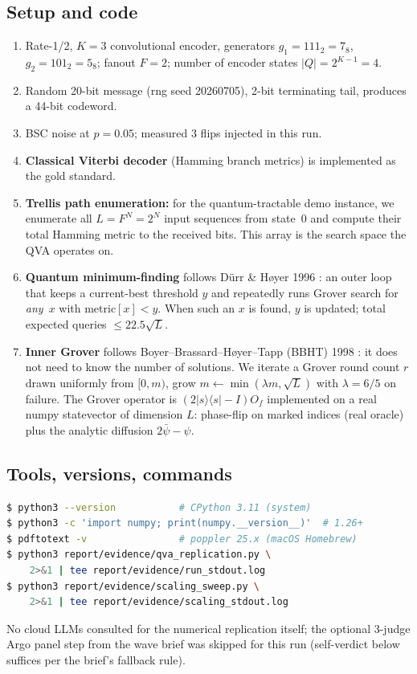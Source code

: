 \documentclass[11pt]{article}
\begin{document}
\subsection{Setup and code}
\begin{enumerate}
\item Rate-1/2, $K{=}3$ convolutional encoder, generators
      $g_1{=}111_2{=}7_8$, $g_2{=}101_2{=}5_8$; fanout $F{=}2$; number
      of encoder states $|Q|{=}2^{K-1}{=}4$.
\item Random 20-bit message (rng seed 20260705), 2-bit terminating
      tail, produces a 44-bit codeword.
\item BSC noise at $p{=}0.05$; measured 3 flips injected in this run.
\item \textbf{Classical Viterbi decoder} (Hamming branch metrics) is
      implemented as the gold standard.
\item \textbf{Trellis path enumeration:} for the quantum-tractable
      demo instance, we enumerate all $L{=}F^N{=}2^N$ input sequences
      from state~$0$ and compute their total Hamming metric to the
      received bits. This array is the search space the QVA operates
      on.
\item \textbf{Quantum minimum-finding} follows D\"urr \& H{\o}yer 1996
      \cite{durr1996}: an outer loop that keeps a current-best
      threshold $y$ and repeatedly runs Grover search for
      \emph{any}~$x$ with $\text{metric}[x] < y$. When such an $x$ is
      found, $y$ is updated; total expected queries $\le 22.5\sqrt L$.
\item \textbf{Inner Grover} follows Boyer--Brassard--H{\o}yer--Tapp
      (BBHT) 1998 \cite{bbht}: it does not need to know the number of
      solutions. We iterate a Grover round count $r$ drawn uniformly
      from $[0, m)$, grow $m \leftarrow \min(\lambda m,\sqrt L)$ with
      $\lambda{=}6/5$ on failure. The Grover operator is
      $(2|s\rangle\langle s|-I)O_f$ implemented on a real numpy
      statevector of dimension $L$: phase-flip on marked indices
      (real oracle) plus the analytic diffusion $2\bar\psi - \psi$.
\end{enumerate}

\subsection{Tools, versions, commands}
\begin{lstlisting}[language=bash]
$ python3 --version           # CPython 3.11 (system)
$ python3 -c 'import numpy; print(numpy.__version__)'  # 1.26+
$ pdftotext -v                # poppler 25.x (macOS Homebrew)
$ python3 report/evidence/qva_replication.py \
    2>&1 | tee report/evidence/run_stdout.log
$ python3 report/evidence/scaling_sweep.py \
    2>&1 | tee report/evidence/scaling_stdout.log
\end{lstlisting}
No cloud LLMs consulted for the numerical replication itself; the
optional 3-judge Argo panel step from the wave brief was skipped for
this run (self-verdict below suffices per the brief's fallback rule).
\end{document}
